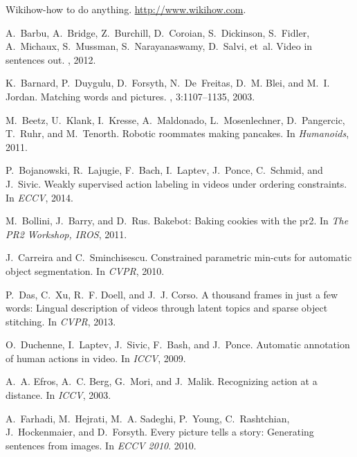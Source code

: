 \documentclass[10pt,twocolumn,letterpaper]{article}
\begin{document}
\iffalse
\begin{thebibliography}{10}\itemsep=-1pt

Wikihow-how to do anything.
\newblock \url{http://www.wikihow.com}.

A.~Barbu, A.~Bridge, Z.~Burchill, D.~Coroian, S.~Dickinson, S.~Fidler,
  A.~Michaux, S.~Mussman, S.~Narayanaswamy, D.~Salvi, et~al.
\newblock Video in sentences out.
, 2012.

K.~Barnard, P.~Duygulu, D.~Forsyth, N.~De~Freitas, D.~M. Blei, and M.~I.
  Jordan.
\newblock Matching words and pictures.
, 3:1107--1135, 2003.

M.~Beetz, U.~Klank, I.~Kresse, A.~Maldonado, L.~Mosenlechner, D.~Pangercic,
  T.~Ruhr, and M.~Tenorth.
\newblock Robotic roommates making pancakes.
\newblock In {\em Humanoids}, 2011.

P.~Bojanowski, R.~Lajugie, F.~Bach, I.~Laptev, J.~Ponce, C.~Schmid, and
  J.~Sivic.
\newblock Weakly supervised action labeling in videos under ordering
  constraints.
\newblock In {\em ECCV}, 2014.

M.~Bollini, J.~Barry, and D.~Rus.
\newblock Bakebot: Baking cookies with the pr2.
\newblock In {\em The PR2 Workshop, IROS}, 2011.

J.~Carreira and C.~Sminchisescu.
\newblock Constrained parametric min-cuts for automatic object segmentation.
\newblock In {\em CVPR}, 2010.

P.~Das, C.~Xu, R.~F. Doell, and J.~J. Corso.
\newblock A thousand frames in just a few words: Lingual description of videos
  through latent topics and sparse object stitching.
\newblock In {\em CVPR}, 2013.

O.~Duchenne, I.~Laptev, J.~Sivic, F.~Bash, and J.~Ponce.
\newblock Automatic annotation of human actions in video.
\newblock In {\em ICCV}, 2009.

A.~A. Efros, A.~C. Berg, G.~Mori, and J.~Malik.
\newblock Recognizing action at a distance.
\newblock In {\em ICCV}, 2003.

A.~Farhadi, M.~Hejrati, M.~A. Sadeghi, P.~Young, C.~Rashtchian, J.~Hockenmaier,
  and D.~Forsyth.
\newblock Every picture tells a story: Generating sentences from images.
\newblock In {\em ECCV 2010}. 2010.


\end{thebibliography}
\end{document}
